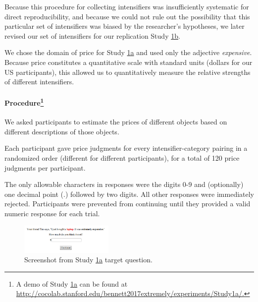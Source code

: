 \documentclass[10pt,letterpaper]{article}
\newcommand{\w}[1]{\emph{#1}}
\begin{document}
Because this procedure for collecting intensifiers was insufficiently systematic for direct reproducibility, and because we could not rule out the possibility that this particular set of intensifiers was biased by the researcher's hypotheses, we later revised our set of intensifiers for our replication Study \hyperref[sec:study1b]{1b}.

We chose the domain of price for Study \hyperref[sec:study1a]{1a} and used only the adjective \w{expensive}.
Because price constitutes a quantitative scale with standard units (dollars for our US participants), this allowed us to quantitatively measure the relative strengths of different intensifiers.

\paragraph{Procedure\footnote{A demo of Study \hyperref[sec:study1a]{1a} can be found at \url{http://cocolab.stanford.edu/bennett2017extremely/experiments/Study1a/.}}}

We asked participants to estimate the prices of different objects based on different descriptions of those objects. 

Each participant gave price judgments for every intensifier-category pairing in a randomized order (different for different participants), for a total of 120 price judgments per participant.  

The only allowable characters in responses were the digits 0-9 and (optionally) one decimal point (.) followed by two digits. All other responses were immediately rejected.
Participants were prevented from continuing until they provided a valid numeric response for each trial.

\begin{figure}[ht]
\begin{center}
\includegraphics[width=0.4\textwidth]{exp1-q.png}
\end{center}
\caption{Screenshot from Study \hyperref[sec:study1a]{1a} target question.} 
\label{fig:question_study1a}
\end{figure}
\end{document}

